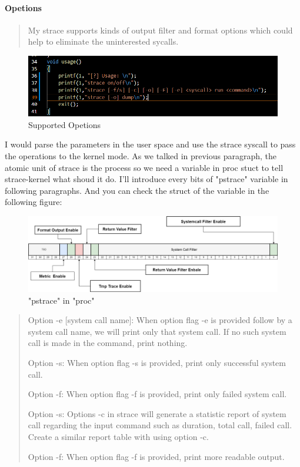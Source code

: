 \documentclass[11pt,oneside,a4paper]{article}
\begin{document}
\paragraph*{Opetions}

\begin{quotation}
    My strace supports kinds of output filter and format options which could help to 
eliminate the uninterested sycalls. 
\end{quotation}

\begin{figure}[H]
    \includegraphics[width=4.75in]{1-19.png}
    \centering
    \caption{Supported Opetions}
\end{figure}

I would parse the parameters in the user space and use the strace syscall to 
pass the operations to the kernel mode. 
As we talked in previous paragraph, the atomic unit of strace is the process so 
we need a variable in proc stuct to tell strace-kernel what shoud it do. I'll 
introduce every bits of "pstrace" variable in following paragraphs. And you can 
check the struct of the variable in the following figure:

\begin{figure}[H]
    \includegraphics[width=4.75in]{pstrace.png}
    \centering
    \caption{"pstrace" in "proc"}
\end{figure}


\begin{quotation}
    Option -e [system call name]:
    When option flag -e is provided follow by a system call name, we will print only that
    system call. If no such system call is made in the command, print nothing.

    Option -s:
    When option flag -s is provided, print only successful system call.

    Option -f:
    When option flag -f is provided, print only failed system call.

    Option -s:
    Options -c in strace will generate a statistic report of system call regarding the input command
    such as duration, total call, failed call. Create a similar report table with using option -c.

    Option -f:
    When option flag -f is provided, print more readable output.

\end{quotation}
\end{document}
